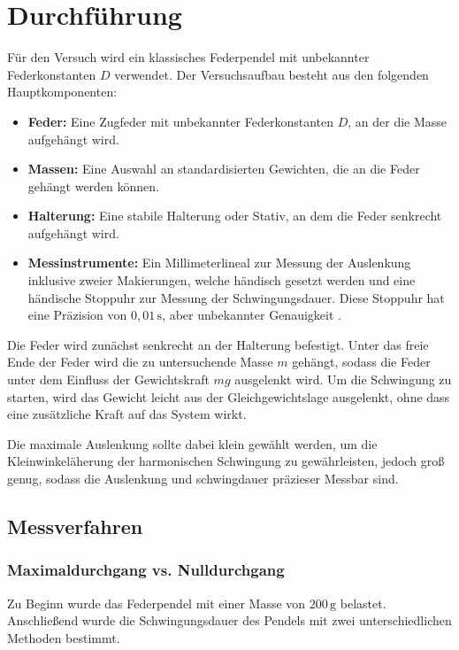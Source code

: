 \chapter{Durchführung}

Für den Versuch wird ein klassisches Federpendel mit unbekannter Federkonstanten $D$ verwendet. Der Versuchsaufbau besteht aus den folgenden Hauptkomponenten:

\begin{itemize}
    \item \textbf{Feder:} Eine Zugfeder mit unbekannter Federkonstanten $D$, an der die Masse aufgehängt wird.
    \item \textbf{Massen:} Eine Auswahl an standardisierten Gewichten, die an die Feder gehängt werden können.
    \item \textbf{Halterung:} Eine stabile Halterung oder Stativ, an dem die Feder senkrecht aufgehängt wird.
    \item \textbf{Messinstrumente:} Ein Millimeterlineal zur Messung der Auslenkung inklusive zweier Makierungen, welche händisch gesetzt werden und eine händische Stoppuhr zur Messung der Schwingungsdauer. Diese Stoppuhr hat eine Präzision von $0,01\,\mathrm{s}$, aber unbekannter Genauigkeit \cite{Stoppuhr}.
\end{itemize}

Die Feder wird zunächst senkrecht an der Halterung befestigt. Unter das freie Ende der Feder wird die zu untersuchende Masse $m$ gehängt, sodass die Feder unter dem Einfluss der Gewichtskraft $mg$ ausgelenkt wird. Um die Schwingung zu starten, wird das Gewicht leicht aus der Gleichgewichtslage ausgelenkt, ohne dass eine zusätzliche Kraft auf das System wirkt.  

Die maximale Auslenkung sollte dabei klein gewählt werden, um die Kleinwinkeläherung der harmonischen Schwingung zu gewährleisten, jedoch groß genug, sodass die Auslenkung und schwingdauer präzieser Messbar sind.

\section{Messverfahren}
\subsection*{Maximaldurchgang vs. Nulldurchgang}

Zu Beginn wurde das Federpendel mit einer Masse von $200\,\mathrm{g}$ belastet. Anschließend wurde die Schwingungsdauer des Pendels mit zwei unterschiedlichen Methoden bestimmt.  

